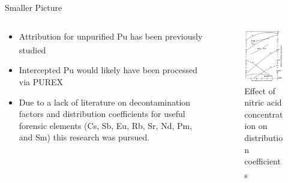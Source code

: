 \documentclass{beamer}
\newcommand{\tss}{\textsuperscript}
\begin{document}
\begin{frame}{Smaller Picture}
  \begin{columns}
    \begin{column}{0.5\textwidth}
      \vspace{-3mm}
      \begin{itemize}
      \item{Attribution for unpurified Pu has been previously studied
        \tss{\cite{chirayath2015trace,scott2005nuclear,glaser2009isotopic}}}
      \item{Intercepted Pu would likely have been processed via PUREX}
      \item{Due to a lack of literature on decontamination factors and
        distribution coefficients for useful forensic elements (Cs, Sb,
        Eu, Rb, Sr, Nd, Pm, and Sm) this research was pursued.} 
      \end{itemize}
    \end{column}
    \begin{column}{0.5\textwidth}
      \begin{figure}[H]
        \vspace*{-0.3cm}
        \begin{center}
	   \includegraphics[scale = 0.4]{Stoller}
           \caption{\tiny{Effect of nitric acid concentration on
               distribution coefficients \tss{\cite{stoller1961reactor}}}}
	\end{center}
      \end{figure}
    \end{column}
  \end{columns}  
\end{frame}
\end{document}
